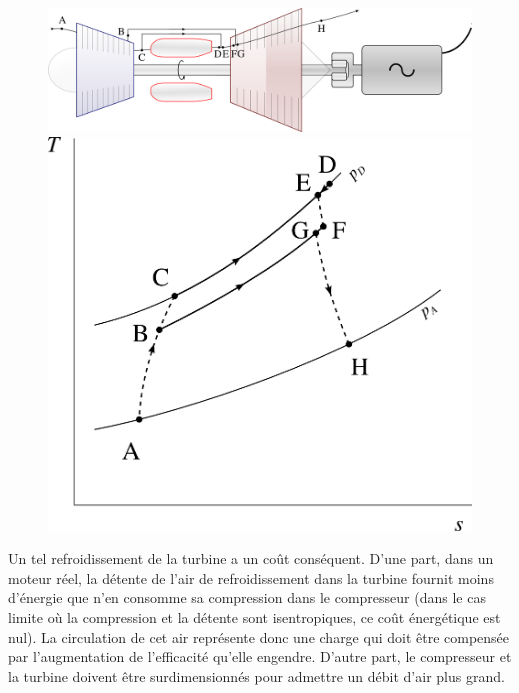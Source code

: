 		\begin{figure}
			\begin{center}
				\includegraphics[scale=0.6]{images/circuit_refroidissement_turbine.png}\vspace{0.5cm}
				\includegraphics[scale=0.6]{images/ts_gp_refroidissement_turbine.png}
			\end{center}
			\label{fig_refroidissement_turbine}
		\end{figure}

		Un tel refroidissement de la turbine a un coût conséquent. D’une part, dans un moteur réel, la détente de l’air de refroidissement dans la turbine fournit moins d’énergie que n’en consomme sa compression dans le compresseur (dans le cas limite où la compression et la détente sont isentropiques, ce coût énergétique est nul). La circulation de cet air représente donc une charge qui doit être compensée par l’augmentation de l’efficacité qu’elle engendre. D’autre part, le compresseur et la turbine doivent être surdimensionnés pour admettre un débit d’air plus grand.

